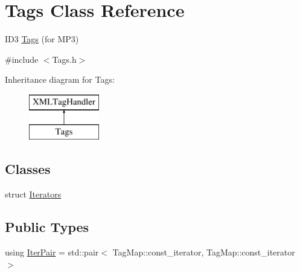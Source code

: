 \hypertarget{class_tags}{}\section{Tags Class Reference}
\label{class_tags}


I\+D3 \hyperlink{class_tags}{Tags} (for M\+P3)  




{\ttfamily \#include $<$Tags.\+h$>$}

Inheritance diagram for Tags\+:\begin{figure}[H]
\begin{center}
\leavevmode
\includegraphics[height=2.000000cm]{class_tags}
\end{center}
\end{figure}
\subsection*{Classes}
\begin{DoxyCompactItemize}
\item 
struct \hyperlink{struct_tags_1_1_iterators}{Iterators}
\end{DoxyCompactItemize}
\subsection*{Public Types}
\begin{DoxyCompactItemize}
\item 
using \hyperlink{class_tags_adff11ce4417aed10fef3bec95a1f7518}{Iter\+Pair} = std\+::pair$<$ Tag\+Map\+::const\+\_\+iterator, Tag\+Map\+::const\+\_\+iterator $>$
\end{DoxyCompactItemize}
